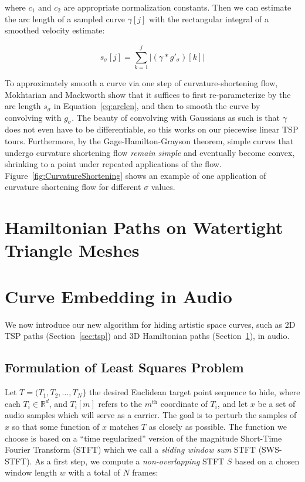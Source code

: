 \documentclass[runningheads]{llncs}
\begin{document}
where $c_1$ and $c_2$ are appropriate normalization constants.  Then we can estimate the arc length of a sampled curve $\gamma[j]$ with the rectangular integral of a smoothed velocity estimate:

\begin{equation}
  \label{eq:arclen}
  s_{\sigma}[j] = \sum_{k=1}^j |(\gamma * g'_{\sigma})[k]|
\end{equation}

To approximately smooth a curve via one step of curvature-shortening flow, Mokhtarian and Mackworth \cite{mokhtarian1992theory} show that it suffices to first re-parameterize by the arc length $s_{\sigma}$ in Equation~\ref{eq:arclen}, and then to smooth the curve by convolving with $g_{\sigma}$.  The beauty of convolving with Gaussians as such is that $\gamma$ does not even have to be differentiable, so this works on our piecewise linear TSP tours.  Furthermore, by the Gage-Hamilton-Grayson theorem, simple curves that undergo curvature shortening flow {\em remain simple} and eventually become convex, shrinking to a point under repeated applications of the flow.  Figure~\ref{fig:CurvatureShortening} shows an example of one application of curvature shortening flow for different $\sigma$ values.



\section{Hamiltonian Paths on Watertight Triangle Meshes}
\label{sec:hamiltonian}



\section{Curve Embedding in Audio}

We now introduce our new algorithm for hiding artistic space curves, such as 2D TSP paths (Section~\ref{sec:tsp}) and 3D Hamiltonian paths (Section~\ref{sec:hamiltonian}), in audio.

\subsection{Formulation of Least Squares Problem}

Let $T = (T_1, T_2, \hdots, T_N \}$ the desired Euclidean target point sequence to hide, where each $T_i \in \mathbb{R}^d$, and $T_i[m]$ refers to the $m^{\text{th}}$ coordinate of $T_i$, and let $x$ be a set of audio samples which will serve as a carrier.  The goal is to perturb the samples of $x$ so that some function of $x$ matches $T$ as closely as possible.  The function we choose is based on a ``time regularized'' version of the magnitude Short-Time Fourier Transform (STFT) which we call a {\em sliding window sum} STFT (SWS-STFT).  As a first step, we compute a {\em non-overlapping} STFT $S$ based on a chosen window length $w$ with a total of $N$ frames:
\end{document}
